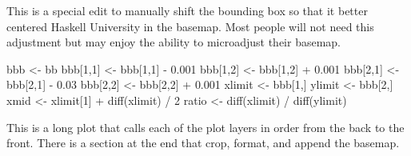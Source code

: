\documentclass[
  paper=a4,
  ,captions=tableheading
]{scrartcl}
\newenvironment{Shaded}{\begin{snugshade}}{\end{snugshade}}
\newcommand{\DecValTok}[1]{\textcolor[rgb]{0.00,0.00,0.81}{#1}}
\newcommand{\FloatTok}[1]{\textcolor[rgb]{0.00,0.00,0.81}{#1}}
\newcommand{\FunctionTok}[1]{\textcolor[rgb]{0.00,0.00,0.00}{#1}}
\newcommand{\NormalTok}[1]{#1}
\newcommand{\OtherTok}[1]{\textcolor[rgb]{0.56,0.35,0.01}{#1}}
\newcommand{\SpecialCharTok}[1]{\textcolor[rgb]{0.00,0.00,0.00}{#1}}
\begin{document}
This is a special edit to manually shift the bounding box so that it
better centered Haskell University in the basemap. Most people will not
need this adjustment but may enjoy the ability to microadjust their
basemap.

\begin{Shaded}
\begin{Highlighting}[]
\NormalTok{bbb }\OtherTok{\textless{}{-}}\NormalTok{ bb}
\NormalTok{bbb[}\DecValTok{1}\NormalTok{,}\DecValTok{1}\NormalTok{] }\OtherTok{\textless{}{-}}\NormalTok{ bbb[}\DecValTok{1}\NormalTok{,}\DecValTok{1}\NormalTok{] }\SpecialCharTok{{-}} \FloatTok{0.001}
\NormalTok{bbb[}\DecValTok{1}\NormalTok{,}\DecValTok{2}\NormalTok{] }\OtherTok{\textless{}{-}}\NormalTok{ bbb[}\DecValTok{1}\NormalTok{,}\DecValTok{2}\NormalTok{] }\SpecialCharTok{+} \FloatTok{0.001}
\NormalTok{bbb[}\DecValTok{2}\NormalTok{,}\DecValTok{1}\NormalTok{] }\OtherTok{\textless{}{-}}\NormalTok{ bbb[}\DecValTok{2}\NormalTok{,}\DecValTok{1}\NormalTok{] }\SpecialCharTok{{-}} \FloatTok{0.03}
\NormalTok{bbb[}\DecValTok{2}\NormalTok{,}\DecValTok{2}\NormalTok{] }\OtherTok{\textless{}{-}}\NormalTok{ bbb[}\DecValTok{2}\NormalTok{,}\DecValTok{2}\NormalTok{] }\SpecialCharTok{+} \FloatTok{0.001}
\NormalTok{xlimit }\OtherTok{\textless{}{-}}\NormalTok{ bbb[}\DecValTok{1}\NormalTok{,]}
\NormalTok{ylimit }\OtherTok{\textless{}{-}}\NormalTok{ bbb[}\DecValTok{2}\NormalTok{,] }
\NormalTok{xmid }\OtherTok{\textless{}{-}}\NormalTok{ xlimit[}\DecValTok{1}\NormalTok{] }\SpecialCharTok{+} \FunctionTok{diff}\NormalTok{(xlimit) }\SpecialCharTok{/} \DecValTok{2} 
\NormalTok{ratio }\OtherTok{\textless{}{-}} \FunctionTok{diff}\NormalTok{(xlimit) }\SpecialCharTok{/} \FunctionTok{diff}\NormalTok{(ylimit)}
\end{Highlighting}
\end{Shaded}

This is a long plot that calls each of the plot layers in order from the
back to the front. There is a section at the end that crop, format, and
append the basemap.
\end{document}
